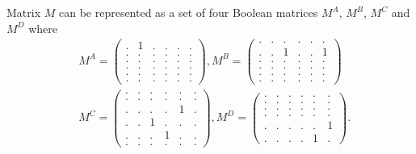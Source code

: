 Matrix $M$ can be represented as a set of four Boolean matrices $M^A$, $M^B$, $M^C$ and $M^D$ where
\begin{align*}
& M^{A} =    
\begin{pmatrix}
    .     &   1   &   .   &   .   &   .   &   .   \\
    .     &   .   &   .   &   .   &   .   &   .   \\
    .     &   .   &   .   &   .   &   .   &   .   \\
    .     &   .   &   .   &   .   &   .   &   .   \\
    .     &   .   &   .   &   .   &   .   &   .   \\
    .     &   .   &   .   &   .   &   .   &   .
\end{pmatrix}, 
M^{B} =
\begin{pmatrix}
    .     &   .   &   .   &   .   &   .   &   .   \\
    .     &   .   &   1   &   .   &   .   &   1   \\
    .     &   .   &   .   &   .   &   .   &   .   \\
    .     &   .   &   .   &   .   &   .   &   .   \\
    .     &   .   &   .   &   .   &   .   &   .   \\
    .     &   .   &   .   &   .   &   .   &   .
\end{pmatrix} \\
& M^{C} =
\begin{pmatrix}
    .     &   .   &   .   &   .   &   .   &   .   \\
    .     &   .   &   .   &   .   &   .   &   .   \\
    .     &   .   &   .   &   .   &   1   &   .   \\
    .     &   .   &   1   &   .   &   .   &   .   \\
    .     &   .   &   .   &   1   &   .   &   .   \\
    .     &   .   &   .   &   .   &   .   &   .
\end{pmatrix},
M^{D} =
\begin{pmatrix}
    .     &   .   &   .   &   .   &   .   &   .   \\
    .     &   .   &   .   &   .   &   .   &   .   \\
    .     &   .   &   .   &   .   &   .   &   .   \\
    .     &   .   &   .   &   .   &   .   &   .   \\
    .     &   .   &   .   &   .   &   .   &   1   \\
    .     &   .   &   .   &   .   &   1   &   .
\end{pmatrix}.
\label{eq:boolean_decomposition_of_graph}
\end{align*}

